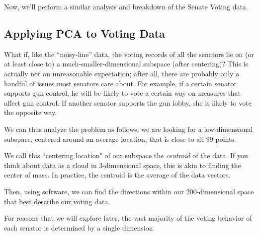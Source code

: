 \documentclass{ximera}
\begin{document}
Now, we'll perform a similar analysis and breakdown of the Senate Voting data.

\subsection*{Applying PCA to Voting Data}

What if, like the ``noisy-line'' data,
the voting records of all the senators lie on (or at least close to) a
much-smaller-dimensional subspace (after centering)? This is actually not an
unreasonable expectation; after all, there are probably only a handful
of issues most senators care about. For example, if a certain senator
supports gun control, he will be likely to vote a certain way on
measures that affect gun control. If another senator supports the gun
lobby, she is likely to vote the opposite way.

We can thus analyze the 
problem as follows: we are looking for a low-dimensional subspace, centered around an average location, that is
close to all $99$ points. 

We call this ``centering location" of our subspace the \emph{centroid} of the data. If you think about data as a cloud in 3-dimensional space, this is akin to finding the center of mass. In practice, the centroid is the average of the data vectors. 

Then, using software, we can find the directions within our 200-dimensional space that best describe our voting data.


For reasons that we will explore later, the vast
majority of the voting behavior of each senator is determined by a
single dimension %

\end{document}
